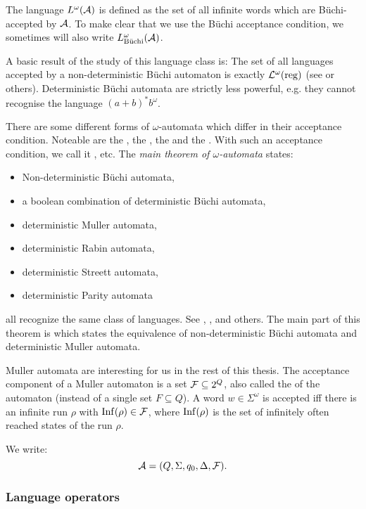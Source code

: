 The language $L^\omega(\mathcal{A})$ is defined as the set of all infinite words which are Büchi-accepted by  $\mathcal{A}$. To make clear that we use the Büchi acceptance condition, we sometimes will also write $L^\omega_\text{Büchi}(\mathcal{A})$.

A basic result of the study of this language class is: The set of all languages accepted by a non-deterministic Büchi automaton is exactly $\mathcal{L}^\omega(\textup{\textrm{reg}})$ (see \cite{InfCompR101} or others). %
Deterministic Büchi automata are strictly less powerful, e.g. they cannot recognise the language $(a+b)^* b^\omega$.

There are some different forms of $\omega$-automata which differ in their acceptance condition. Noteable are the , the , the  and the . With such an acceptance condition, we call it , etc. The \emph{main theorem of $\omega$-automata} states:
\begin{itemize}
\item Non-deterministic Büchi automata,
\item a boolean combination of deterministic Büchi automata,
\item deterministic Muller automata,
\item deterministic Rabin automata,
\item deterministic Streett automata,
\item deterministic Parity automata
\end{itemize}
all recognize the same class of languages. See \cite{InfCompR101}, \cite{LangAutLogicR102}, \cite{InfWordsR110} and others. The main part of this theorem is  which states the equivalence of non-deterministic Büchi automata and deterministic Muller automata.

Muller automata are interesting for us in the rest of this thesis. The acceptance component of a Muller automaton is a set $\mathcal{F} \subseteq 2^Q$, also called the  of the automaton (instead of a single set $F \subseteq Q$). A word $w \in \Sigma^\omega$ is accepted iff there is an infinite run $\rho$ with $\operatorname{Inf}(\rho) \in \mathcal{F}$, where $\operatorname{Inf}(\rho)$ is the set of infinitely often reached states of the run $\rho$.

We write:
\[ \mathcal{A} = (Q, \Sigma, q_0, \Delta, \mathcal{F}) . \]

\subsubsection{Language operators}
\label{reg:omega:vialangop}

